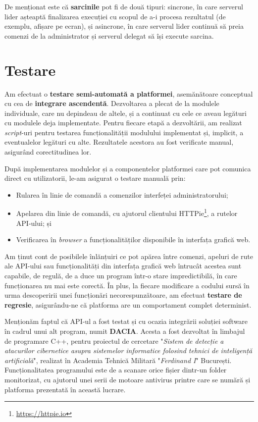 \documentclass[../../main.tex]{subfiles}
\begin{document}
\newpage

De menționat este că \textbf{sarcinile} pot fi de două tipuri: sincrone, în care serverul lider așteaptă finalizarea execuției cu scopul de a-i procesa rezultatul (de exemplu, afișare pe ecran), și asincrone, în care serverul lider continuă să preia comenzi de la administrator și serverul delegat să își execute sarcina.

\section{Testare}
\label{sec:platform_testing}

Am efectuat o \textbf{testare semi-automată a platformei}, asemănătoare conceptual cu cea de \textbf{integrare ascendentă}. Dezvoltarea a plecat de la modulele individuale, care nu depindeau de altele, și a continuat cu cele ce aveau legături cu modulele deja implementate. Pentru fiecare etapă a dezvoltării, am realizat \textit{script}-uri pentru testarea funcționalității modulului implementat și, implicit, a eventualelor legături cu alte. Rezultatele acestora au fost verificate manual, asigurând corectitudinea lor.

După implementarea modulelor și a componentelor platformei care pot comunica direct cu utilizatorii, le-am asigurat o testare manuală prin:

\begin{itemize}
    \item Rularea în linie de comandă a comenzilor interfeței administratorului;
    \item Apelarea din linie de comandă, cu ajutorul clientului HTTPie\footnote{\href{https://httpie.io}{https://httpie.io}}, a rutelor API-ului; și
    \item Verificarea în \textit{browser} a funcționalităților disponibile în interfața grafică web.
\end{itemize}

Am ținut cont de posibilele înlănțuiri ce pot apărea între comenzi, apeluri de rute ale API-ului sau funcționalități din interfața grafică web întrucât acestea sunt capabile, de regulă, de a duce un program într-o stare impredictibilă, în care funcționarea nu mai este corectă. În plus, la fiecare modificare a codului sursă în urma descoperirii unei funcționări necorespunzătoare, am efectuat \textbf{testare de regresie}, asigurându-ne că platforma are un comportament complet determinist.

Menționăm faptul că API-ul a fost testat și cu ocazia integrării soluției software în cadrul unui alt program, numit \textbf{DACIA}. Acesta a fost dezvoltat în limbajul de programare C++, pentru proiectul de cercetare "\textit{Sistem de detecție a atacurilor cibernetice asupra sistemelor informatice folosind tehnici de inteligen\-ță artificială}", realizat în Academia Tehnică Militară "\textit{Ferdinand I}" București. Funcționalitatea programului este de a scanare orice fișier dintr-un folder moni\-torizat, cu ajutorul unei serii de motoare antivirus printre care se numără și platforma prezentată în această lucrare.
\end{document}
